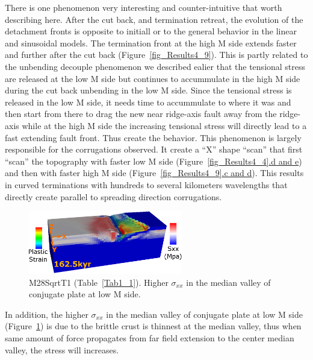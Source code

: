 There is one phenomenon very interesting and counter-intuitive that worth describing here. After the cut back, and termination retreat, the evolution of the detachment fronts is opposite to initiall or to the general behavior in the linear and sinusoidal models. The termination front at the high M side extends faster and further after the cut back (Figure~\hyperref[fig_Results4_9]{\ref{fig_Results4_9}}). This is partly related to the unbending decouple phenomenon we described ealier that the tensional stress are released at the low M side but continues to accummulate in the high M side during the cut back unbending in the low M side. Since the tensional stress is released in the low M side, it needs time to accummulate to where it was and then start from there to drag the new near ridge-axis fault away from the ridge-axis while at the high M side the increasing tensional stress will directly lead to a fast extending fault front. Thus create the behavior.  This phenomenon is largely responsible for the corrugations observed. It create a ``X'' shape ``scan'' that first ``scan'' the topography with faster low M side (Figure~\hyperref[fig_Results4_4]{\ref{fig_Results4_4}.d and e}) and then with faster high M side (Figure~\hyperref[fig_Results4_9]{\ref{fig_Results4_9}.c and d}). This results in curved terminations with hundreds to several kilometers wavelengths that directly create parallel to spreading direction corrugations.    

\begin{figure}[h]
  \centering
    \includegraphics[width=0.6\textwidth]{./Figures/fig_Results4_7_sqrt_cut_back_conjugate_Sxx.eps}
  \caption{M28SqrtT1 (Table~\hyperref[Tab1_1]{\ref{Tab1_1}}). Higher $\sigma_{xx}$ in the median valley of conjugate plate at low M side. }
 \label{fig_Results4_7}
\end{figure}

In addition, the higher $\sigma_{xx}$ in the median valley of conjugate plate at low M side (Figure~\hyperref[fig_Results4_7]{\ref{fig_Results4_7}}) is due to the brittle crust is thinnest at the median valley, thus when same amount of force propagates from far field extension to the center median valley, the stress will increases.    

